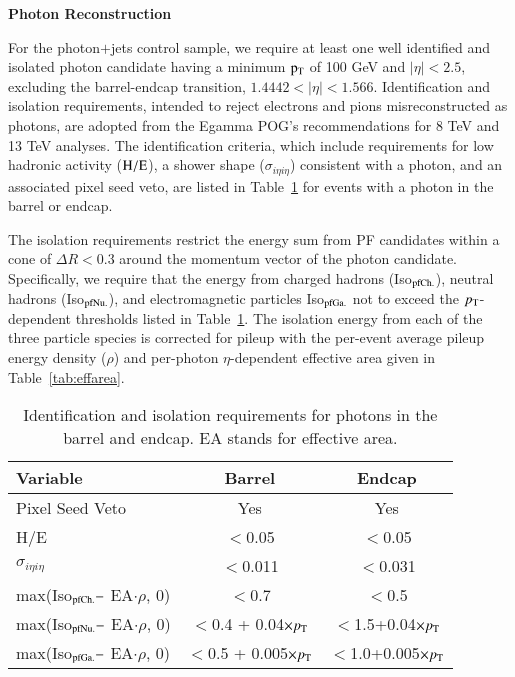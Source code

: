 {\bf Photon Reconstruction}

For the photon$+$jets control sample, we require at least one well identified and isolated photon candidate having a minimum $\rm p_{T}$ of 100 GeV and  $|\eta|<2.5$, excluding the barrel-endcap transition, $1.4442<|\eta|<1.566$.  Identification and isolation requirements, intended to reject electrons and pions misreconstructed as photons, are adopted from the Egamma POG's recommendations for 8 TeV and 13 TeV analyses.  The identification criteria, which include requirements for low hadronic activity ($\rm H/E$), a shower shape ($\sigma_{i\eta i\eta}$) consistent with a photon, and an associated pixel seed veto, are listed in Table~\ref{tab:IDISOcuts} for events with a photon in the barrel or endcap.

The isolation requirements restrict the energy sum from PF candidates within a cone of $\Delta R<0.3$ around the momentum vector of the photon candidate.  Specifically, we require that the energy from charged hadrons (Iso$_{\rm pfCh.}$), neutral hadrons (Iso$_{\rm pfNu.}$), and electromagnetic particles Iso$_{\rm pfGa.}$ not to exceed the $p_{\rm T}$-dependent thresholds listed in Table~\ref{tab:IDISOcuts}.  The isolation energy from each of the three particle species is corrected for pileup with the per-event average pileup energy density ($\rho$) and per-photon $\eta$-dependent effective area given in Table~\ref{tab:effarea}.  


\begin{table}[h]
\begin{center}
\caption{Identification and isolation requirements for photons in the barrel and endcap. EA stands for effective area.}
\begin{tabular}{|l|c|c|}
\hline
Variable & Barrel & Endcap \\ 
\hline
Pixel Seed Veto & Yes & Yes \\
H/E & $<$0.05 & $<$0.05 \\
$\sigma_{i\eta i\eta}$ & $<$0.011 & $<$0.031 \\
\hline
max(Iso$_{\rm pfCh.} - $ EA$\cdot\rho$, 0) & $<$0.7 & $<$0.5 \\
max(Iso$_{\rm pfNu.} - $ EA$\cdot\rho$, 0) & $<$0.4 + 0.04$\times p_{\rm T}$ & $<$1.5+0.04$\times p_{\rm T}$ \\
max(Iso$_{\rm pfGa.} - $ EA$\cdot\rho$, 0) & $<$0.5 + 0.005$\times p_{\rm T}$ & $<$1.0+0.005$\times p_{\rm T}$ \\
\hline
\end{tabular}
\label{tab:IDISOcuts} 
\end{center}
\end{table}

